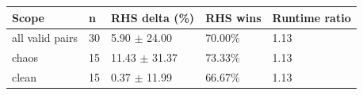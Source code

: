 \begin{tabular}{lllll}
\toprule
Scope & n & RHS delta (\%) & RHS wins & Runtime ratio \\
\midrule
all valid pairs & 30 & 5.90 $\pm$ 24.00 & 70.00\% & 1.13 \\
chaos & 15 & 11.43 $\pm$ 31.37 & 73.33\% & 1.13 \\
clean & 15 & 0.37 $\pm$ 11.99 & 66.67\% & 1.13 \\
\bottomrule
\end{tabular}
